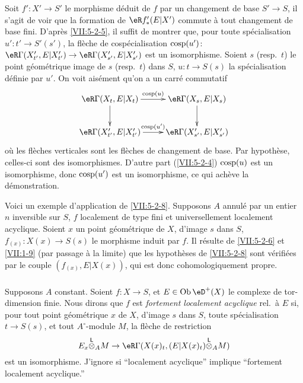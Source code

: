 Soit $f':X'\to S'$ le morphisme déduit de $f$ par un changement de base 
$S'\to S$, il s'agit de voir que la formation de $\eR f_\ast'(E|X')$ commute 
à tout changement de base fini. D'après \ref{VII:5-2-5}, il suffit de 
montrer que, pour toute spécialisation $u':t'\to S'(s')$, la flèche de 
cospécialisation $\operatorname{cosp}(u')$: 
$\eR\Gamma(X_{t'}',E|X_{t'}') \to \eR\Gamma(X_{s'}',E|X_{s'}')$ est un 
isomorphisme. Soient $s$ (resp.\ $t$) le point géométrique image de $s$ 
(resp.\ $t$) dans $S$, $u:t\to S(s)$ la spécialisation définie par $u'$. 
On voit aisément qu'on a un carré commutatif 
\[\xymatrix{
  \eR\Gamma(X_t,E|X_t) \ar[r]^-{\cosp(u)} \ar[d] 
    & \eR\Gamma(X_s,E|X_s) \ar[d] \\
  \eR\Gamma(X_{t'}',E|X_{t'}') \ar[r]^-{\cosp(u')} 
    & \eR\Gamma(X_{s'}',E|X_{s'}') 
}\]
où les flèches verticales sont les flèches de changement de base. Par 
hypothèse, celles-ci sont des isomorphismes. D'autre part (\ref{VII:5-2-4}) 
$\operatorname{cosp}(u)$ est un isomorphisme, donc $\operatorname{cosp}(u')$ est un isomorphisme, ce qui 
achève la démonstration. 

Voici un exemple d'application de \ref{VII:5-2-8}. Supposons $A$ annulé par 
un entier $n$ inversible sur $S$, $f$ localement de type fini et 
universellement localement acyclique. Soient $x$ un point géométrique de 
$X$, d'image $s$ dans $S$, $f_{(x)}:X(x)\to S(s)$ le morphisme induit par $f$. 
Il résulte de \ref{VII:5-2-6} et \ref{VII:1-9} (par passage à la limite) 
que les hypothèses de \ref{VII:5-2-8} sont vérifiées par le couple 
$(f_{(x)},E|X(x))$, qui est donc cohomologiquement propre. 





\subsubsection{}\label{VII:5-2-9}

Supposons $A$ constant. Soient $f:X\to S$, et $E\in\ob\eD^+(X)$ le complexe de 
tor-dimension finie. Nous dirons que $f$ est \emph{fortement localement 
acyclique} rel.\ à $E$ si, pour tout point géométrique $x$ de $X$, 
d'image $s$ dans $S$, toute spécialisation $t\to S(s)$, et tout 
$A^\circ$-module $M$, la flèche de restriction 
\[
  E_x\lotimes_A M \to \eR\Gamma(X(x)_t,(E|X(x)_t)\lotimes_A M) 
\]
est un isomorphisme. J'ignore si ``localement acyclique'' implique 
``fortement localement acyclique.'' 






